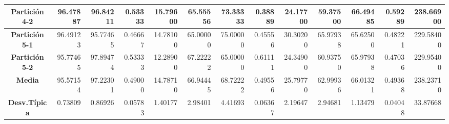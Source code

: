 \documentclass[a4paper,11pt]{article}
\begin{document}
\begin{table}[H]
\begin{adjustbox}{width=1.1\textwidth}
\begin{tabular}{|c|r|r|r|r|r|r|r|r|r|r|r|r|}
  \textbf{Partición 4-2} & 96.47887 & 96.84211 & 0.53333 & 15.79600 & 65.55556 & 73.33333 & 0.38889 & 24.17700 & 59.37500 & 66.49485 & 0.59289 & 238.66900 \\ \hline
  \textbf{Partición 5-1} & 96.49123 & 95.77465 & 0.46667 & 14.78100 & 65.00000 & 75.00000 & 0.45556 & 30.30200 & 65.97938 & 65.62500 & 0.48221 & 229.58400 \\ \hline
  \textbf{Partición 5-2} & 95.77465 & 97.89474 & 0.53333 & 12.28900 & 67.22222 & 65.00000 & 0.61111 & 24.34900 & 60.93750 & 65.97938 & 0.47036 & 229.95400 \\ \hline
  \textbf{Media} & 95.57154 & 97.22301 & 0.49000 & 14.78710 & 66.94445 & 68.72222 & 0.49556 & 25.79770 & 62.99936 & 66.01321 & 0.49368 & 238.23710 \\ \hline
  \textbf{Desv.Típica} & 0.73809 & 0.86926 & 0.05783 & 1.40177 & 2.98401 & 4.41693 & 0.06367 & 2.19647 & 2.94681 & 1.13479 & 0.04048 & 33.87668 \\ \hline
  \end{tabular}
  \end{adjustbox}
  \label{AM2}
  \end{table}
  
\end{document}
